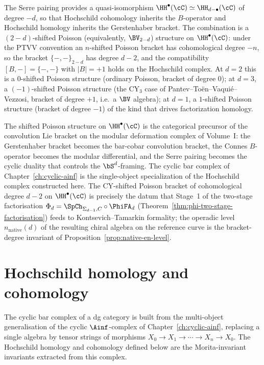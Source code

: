 The Serre pairing provides a quasi-isomorphism $\HH^\bullet(\cC) \simeq \HH_{d-\bullet}(\cC)$ of degree $-d$, so that Hochschild cohomology inherits the $B$-operator and Hochschild homology inherits the Gerstenhaber bracket. The combination is a $(2-d)$-shifted Poisson (equivalently, $\BV_{2-d}$) structure on $\HH^\bullet(\cC)$: under the PTVV convention an $n$-shifted Poisson bracket has cohomological degree $-n$, so the bracket $\{-,-\}_{2-d}$ has degree $d-2$, and the compatibility $[B, -] = \{-,-\}$ with $|B| = +1$ holds on the Hochschild complex. At $d = 2$ this is a $0$-shifted Poisson structure (ordinary Poisson, bracket of degree $0$); at $d = 3$, a $(-1)$-shifted Poisson structure (the CY$_3$ case of Pantev--To\"en--Vaqui\'e--Vezzosi, bracket of degree $+1$, i.e.\ a $\BV$ algebra); at $d = 1$, a $1$-shifted Poisson structure (bracket of degree $-1$) of the kind that drives factorization homology.

The shifted Poisson structure on $\HH^\bullet(\cC)$ is the categorical precursor of the convolution Lie bracket on the modular deformation complex of Volume~I: the Gerstenhaber bracket becomes the bar-cobar convolution bracket, the Connes $B$-operator becomes the modular differential, and the Serre pairing becomes the cyclic duality that controls the $\bS^d$-framing. The cyclic bar complex of Chapter~\ref{ch:cyclic-ainf} is the single-object specialization of the Hochschild complex constructed here. The CY-shifted Poisson bracket of cohomological degree $d-2$ on $\HH^\bullet(\cC)$ is precisely the datum that Stage~1 of the two-stage factorisation $\Phi_d = \SpCh_{\Sigma_{d-1},C} \circ \PhiFA_d$ (Theorem~\ref{thm:phi-two-stage-factorisation}) feeds to Kontsevich--Tamarkin formality; the operadic level $n_{\mathrm{native}}(d)$ of the resulting chiral algebra on the reference curve is the bracket-degree invariant of Proposition~\ref{prop:native-en-level}.


\section{Hochschild homology and cohomology}
\label{sec:hh-basics}

The cyclic bar complex of a dg category is built from the multi-object generalisation of the cyclic $\Ainf$-complex of Chapter~\ref{ch:cyclic-ainf}, replacing a single algebra by tensor strings of morphisms $X_0 \to X_1 \to \cdots \to X_n \to X_0$. The Hochschild homology and cohomology defined below are the Morita-invariant invariants extracted from this complex.

